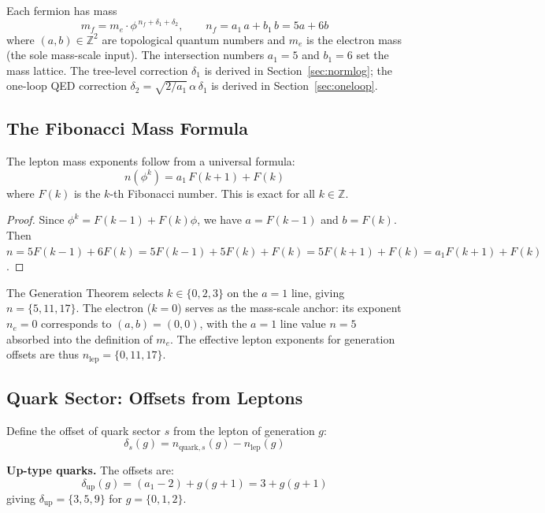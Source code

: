 \documentclass[12pt,a4paper]{article}
\theoremstyle{definition}
\begin{document}
Each fermion has mass
\begin{equation}
\boxed{m_f = m_e \cdot \phi^{\,n_f + \delta_1 + \delta_2}, \qquad n_f = a_1\,a + b_1\,b = 5a + 6b}
\label{eq:mass_formula}
\end{equation}
where $(a,b) \in \mathbb{Z}^2$ are topological quantum numbers and $m_e$ is the electron mass (the sole mass-scale input). The intersection numbers $a_1 = 5$ and $b_1 = 6$ set the mass lattice.  The tree-level correction $\delta_1$ is derived in Section~\ref{sec:normlog}; the one-loop QED correction $\delta_2 = \sqrt{2/a_1}\,\alpha\,\delta_1$ is derived in Section~\ref{sec:oneloop}.

\subsection{The Fibonacci Mass Formula}

The lepton mass exponents follow from a universal formula:
\begin{equation}
\boxed{n(\phi^k) = a_1\,F(k+1) + F(k)}
\label{eq:fibonacci_mass}
\end{equation}
where $F(k)$ is the $k$-th Fibonacci number. This is exact for all $k \in \mathbb{Z}$.

\begin{proof}
Since $\phi^k = F(k-1) + F(k)\phi$, we have $a = F(k-1)$ and $b = F(k)$. Then $n = 5F(k-1) + 6F(k) = 5F(k-1) + 5F(k) + F(k) = 5F(k+1) + F(k) = a_1 F(k+1) + F(k)$.
\end{proof}

The Generation Theorem selects $k \in \{0, 2, 3\}$ on the $a = 1$ line, giving $n = \{5, 11, 17\}$. The electron ($k = 0$) serves as the mass-scale anchor: its exponent $n_e = 0$ corresponds to $(a,b) = (0,0)$, with the $a = 1$ line value $n = 5$ absorbed into the definition of $m_e$. The effective lepton exponents for generation offsets are thus $n_{\text{lep}} = \{0, 11, 17\}$.

\subsection{Quark Sector: Offsets from Leptons}

Define the offset of quark sector $s$ from the lepton of generation $g$:
\begin{equation}
\delta_s(g) = n_{\text{quark},s}(g) - n_{\text{lep}}(g)
\end{equation}

\textbf{Up-type quarks.} The offsets are:
\begin{equation}
\boxed{\delta_{\text{up}}(g) = (a_1 - 2) + g(g+1) = 3 + g(g+1)}
\label{eq:delta_up}
\end{equation}
giving $\delta_{\text{up}} = \{3, 5, 9\}$ for $g = \{0, 1, 2\}$.
\end{document}
